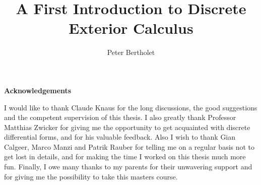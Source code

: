 \documentclass[a4paper]{scrbook}
\newenvironment{acknowledgements}%
    {\cleardoublepage\thispagestyle{empty}\null\vfill\begin{center}%
    \bfseries Acknowledgements\end{center}}%
    {\vfill\null}
\begin{document}
\pagestyle{fancyplain} \thispagestyle{empty}


\title{A First Introduction to Discrete Exterior Calculus}
\author{Peter Bertholet}
 \setcounter{page}{1}
	\maketitle
	


 \setcounter{page}{1}

\begin{acknowledgements}
I would like to thank Claude Knaus for the long discussions, the good suggestions and the competent supervision of this thesis. I also greatly thank Professor Matthias Zwicker for giving me the opportunity to get acquainted with discrete differential forms, and for his valuable feedback.  Also I wish to thank Gian Calgeer, Marco Manzi and Patrik Rauber for telling me on a regular basis not to get lost in details, and for making the time I worked on this thesis much more fun. Finally, I owe many thanks to my parents for their unwavering support and for giving me the possibility to take this masters course.
\end{acknowledgements}

	
 \setcounter{page}{1}
\tableofcontents
	
 \setcounter{page}{1}
\pagestyle{fancy}
	



	







\newpage	

\newpage


	

	
	
	
	
\end{document}
